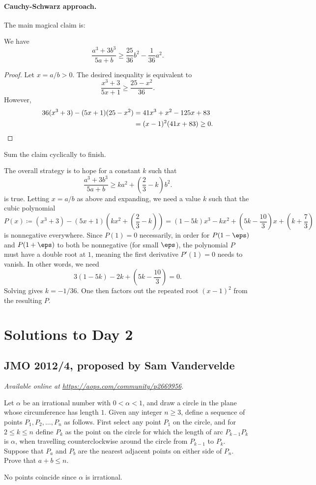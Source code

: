 \documentclass[11pt]{scrartcl}
\begin{document}
\paragraph{Cauchy-Schwarz approach.}
The main magical claim is:
\begin{claim*}
  We have
  \[ \frac{a^3+3b^3}{5a+b} \geq \frac{25}{36}b^2 - \frac{1}{36}a^2. \]
\end{claim*}
\begin{proof}
  Let $x=a/b > 0$. The desired inequality is equivalent to
  \[ \frac{x^3+3}{5x+1} \ge \frac{25-x^2}{36}. \]
  However,
  \begin{align*}
    36(x^3+3) - (5x+1)(25-x^2)
    &= 41x^3 + x^2 - 125x + 83 \\
    &= (x-1)^2(41x+83) \ge 0. \qedhere
  \end{align*}
\end{proof}
Sum the claim cyclically to finish.
\begin{remark*}
  The overall strategy is to hope for a constant $k$ such that
  \[ \frac{a^3+3b^3}{5a+b} \geq ka^2 + \left(\frac{2}{3}-k\right)b^2. \]
  is true.
  Letting $x=a/b$ as above and expanding,
  we need a value $k$ such that the cubic polynomial
  \[ P(x)
    \coloneqq (x^3+3)-(5x+1)\left( kx^2 + \left( \frac 23 - k \right) \right)
    = (1-5k)x^3 - kx^2 + \left( 5k-\frac{10}{3} \right)x
    + \left( k + \frac{7}{3} \right) \]
  is nonnegative everywhere.
  Since $P(1) = 0$ necessarily, in order for $P(1-\eps)$ and $P(1+\eps)$
  to both be nonnegative (for small $\eps$),
  the polynomial $P$ must have a double root at $1$, meaning
  the first derivative $P'(1) = 0$ needs to vanish.
  In other words, we need
  \[ 3(1-5k) - 2k + \left( 5k - \frac{10}{3} \right) = 0. \]
  Solving gives $k = -1/36$.
  One then factors out the repeated root $(x-1)^2$ from the resulting $P$.
\end{remark*}
\pagebreak

\section{Solutions to Day 2}
\subsection{JMO 2012/4, proposed by Sam Vandervelde}
\textsl{Available online at \url{https://aops.com/community/p2669956}.}
\begin{mdframed}[style=mdpurplebox,frametitle={Problem statement}]
Let $\alpha$ be an irrational number with $0 < \alpha < 1$,
and draw a circle in the plane whose
circumference has length $1$.
Given any integer $n\ge 3$,
define a sequence of points $P_1, P_2, \dots, P_n$ as follows.
First select any point $P_1$ on the circle,
and for $2\le k\le n$ define $P_k$
as the point on the circle for which the length
of arc $P_{k-1}P_k$ is $\alpha$,
when travelling counterclockwise around the circle
from $P_{k-1}$ to $P_k$. Suppose that $P_a$ and $P_b$
are the nearest adjacent points on either side of $P_n$.
Prove that $a+b\le n$.
\end{mdframed}
No points coincide since $\alpha$ is irrational.
\end{document}
